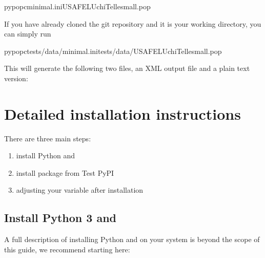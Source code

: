 \documentclass[letterpaper,10pt,english,openany,oneside]{sphinxmanual}
\begin{document}
\begin{sphinxVerbatim}[commandchars=\\\{\}]
pypop\PYGZhy{}cminimal.iniUSAFEL\PYGZhy{}UchiTelle\PYGZhy{}small.pop
\end{sphinxVerbatim}

\sphinxAtStartPar
If you have already cloned the git repository and it is your working
directory, you can simply run

\begin{sphinxVerbatim}[commandchars=\\\{\}]
pypop\PYGZhy{}ctests/data/minimal.initests/data/USAFEL\PYGZhy{}UchiTelle\PYGZhy{}small.pop
\end{sphinxVerbatim}

\sphinxAtStartPar
This will generate the following two files, an XML output file and a
plain text version:

\begin{sphinxVerbatim}[commandchars=\\\{\}]
\end{sphinxVerbatim}


\section{Detailed installation instructions}
\label{\detokenize{docs/guide-chapter-install:detailed-installation-instructions}}
\sphinxAtStartPar
There are three main steps:
\begin{enumerate}
%
\item {} 
\sphinxAtStartPar
install Python and 

\item {} 
\sphinxAtStartPar
install package from Test PyPI

\item {} 
\sphinxAtStartPar
adjusting your  variable after installation

\end{enumerate}


\subsection{Install Python 3 and }
\label{\detokenize{docs/guide-chapter-install:install-python-3-and-pip}}
\sphinxAtStartPar
A full description of installing Python and  on your system is
beyond the scope of this guide, we recommend starting here:
\begin{quote}

\sphinxAtStartPar
{}
\end{quote}
\end{document}

